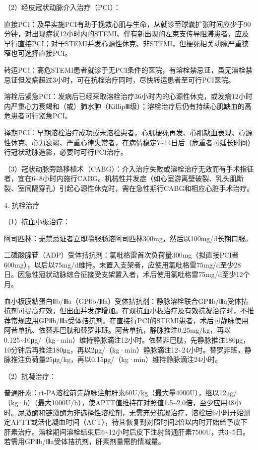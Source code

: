 （2）经皮冠状动脉介入治疗（PCI）：

直接PCI：及早实施PCI有助于挽救心肌与生命，从就诊至球囊扩张时间应少于90分钟，对出现症状12小时内的STEMI、伴有新出现的左束支传导阻滞患者，应及早行直接PCI；对于STEMI并发心源性休克、非STEMI，但梗死相关动脉严重狭窄也可选择直接PCI。

转运PCI：高危STEMI患者就诊于无PCI条件的医院，有溶栓禁忌证，虽无溶栓禁忌证但发病超过3小时，可在抗栓治疗同时，尽快转运患者至可行PCI医院。

溶栓后紧急PCI：发病后已经采取溶栓治疗36小时内的心源性休克，或发病12小时内严重心力衰竭和（或）肺水肿（KillipⅢ级）；溶栓治疗后仍有持续心肌缺血的高危患者可行紧急PCI。

择期PCI：早期溶栓治疗成功或未溶栓患者，心肌梗死再发、心肌缺血表现、心源性休克、心力衰竭、严重心律失常者，在病情稳定7\textasciitilde{}14日后（危重者可延长时间）行冠状动脉造影，必要时可行PCI治疗。

（3）冠状动脉旁路移植术（CABG）：介入治疗失败或溶栓治疗无效而有手术指征者，宜在6\textasciitilde{}8小时内施行CABG。机械性并发症（如心室游离壁破裂、乳头肌断裂、室间隔穿孔）引起心源性休克时，需在急性期行CABG和相应心脏手术治疗。

4. 抗栓治疗

（1）抗血小板治疗：

阿司匹林：无禁忌证者立即嚼服肠溶阿司匹林300mg，然后以100mg/d长期口服。

二磷酸腺苷（ADP）受体拮抗剂：氯吡格雷首次负荷量300mg（拟直接PCI者600mg），以后以75mg/d维持。未置入支架者，应使用氯吡格雷75mg/d至少28日。因急性冠状动脉综合征接受支架置入者，术后使用氯吡格雷75mg/d至少12个月。

血小板膜糖蛋白Ⅱb/Ⅲa（GPⅡb/Ⅲa）受体拮抗剂：静脉溶栓联合GPⅡb/Ⅲa受体拮抗剂可提高疗效，但出血并发症增加。在双抗血小板治疗及有效抗凝治疗时，不推荐常规应用GPⅡb/Ⅲa受体拮抗剂。在直接行PCI的STEMI患者，术后可静脉使用阿昔单抗、依替非巴肽和替罗非班。阿昔单抗，静脉推注0.25mg/kg，再以0.125\textasciitilde{}10μg/（kg·min）维持静脉滴注12小时。依替非巴肽，先静脉推注180μg，10分钟后再推注180μg，再以2μg/（kg·min）静脉滴注12\textasciitilde{}24小时。替罗非班，静脉推注负荷量25μg/kg，再以0.15μg/（kg·min）维持静脉滴注24小时。

（2）抗凝治疗：

普通肝素：rt-PA溶栓前先静脉注射肝素60U/kg（最大量4000U），继以12μg/（kg·h）（最大1000U/h），使APTT值维持在对照值1.5\textasciitilde{}2.0倍，至少应用48小时。尿激酶和链激酶为非选择性溶栓剂，无需充分抗凝治疗，溶栓后6小时开始测定APTT或活化凝血时间（ACT），待其恢复到对照时间2倍以内时开始给予皮下肝素治疗。溶栓期间溶栓结束后6\textasciitilde{}12小时后皮下注射普通肝素7500U，共3\textasciitilde{}5日。若需用GPⅡb/Ⅲa受体拮抗剂，肝素剂量需酌情减量。

